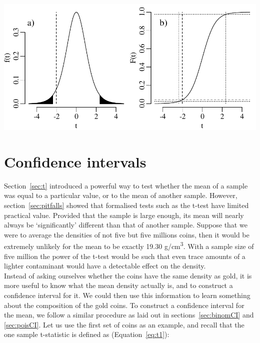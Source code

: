 \noindent\begin{minipage}[t][][b]{.6\textwidth}
  \includegraphics[width=\textwidth]{../figures/2samplettest.pdf}\\
\end{minipage}
\begin{minipage}[t][][t]{.4\textwidth}
  \label{fig:2samplettest}
\end{minipage}

\section{Confidence intervals}
\label{eq:tconf}

Section~\ref{sec:t} introduced a powerful way to test whether the mean
of a sample was equal to a particular value, or to the mean of another
sample. However, section~\ref{sec:pitfalls} showed that formalised
tests such as the t-test have limited practical value. Provided that
the sample is large enough, its mean will nearly always be
`significantly' different than that of another sample. Suppose that we
were to average the densities of not five but five millions coins,
then it would be extremely unlikely for the mean to be exactly 19.30
g/cm\textsuperscript{3}. With a sample size of five million the power
of the t-test would be such that even trace amounts of a lighter
contaminant would have a detectable effect on the density.\\

Instead of asking ourselves whether the coins have the same density as
gold, it is more useful to know what the mean density actually is, and
to construct a confidence interval for it. We could then use this
information to learn something about the composition of the gold
coins. To construct a confidence interval for the mean, we follow a
similar procedure as laid out in sections~\ref{sec:binomCI} and
\ref{sec:poisCI}. Let us use the first set of coins as an example, and
recall that the one sample t-statistic is defined as
(Equation~\ref{eq:t1}):

